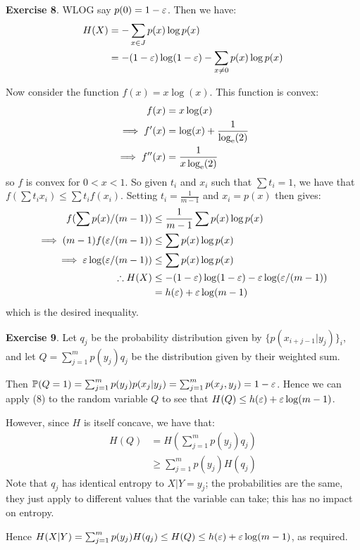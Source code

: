 \documentclass[]{article}
\begin{document}
\textbf{Exercise 8}. WLOG say $p(0) = 1-\varepsilon$. Then we have:
\begin{align*}
    H(X) &= -\sum_{x\in J}p(x)\log p(x)\\
    &= -(1-\varepsilon) \log (1-\varepsilon) -\sum_{x\ne 0}p(x) \log p(x)
\end{align*}

Now consider the function $f(x) = x \log(x)$. This function is convex:
\begin{align*}
    f(x) &= x\log (x)\\
    \implies f'(x) &= \log (x) + \frac{1}{\log_{\mathrm{e}}(2)}\\
    \implies f''(x) &= \frac{1}{x\log_{\mathrm{e}}(2)}
\end{align*}
so $f$ is convex for $0 < x < 1$. So given $t_i$ and $x_i$ such that $\sum t_i = 1$, we have that $f(\sum t_i x_i) \le \sum t_i f(x_i)$. Setting $t_i = \frac{1}{m-1}$ and $x_i = p(x)$ then gives:
\begin{align*}
    f(\sum p(x) / (m-1)) &\le \frac{1}{m-1}\sum p(x)\log p(x)\\
    \implies (m-1)f(\varepsilon /(m-1)) &\le \sum p(x) \log p(x)\\
    \implies \varepsilon \log (\varepsilon/(m-1)) &\le \sum p(x)\log p(x)\\
    \therefore H(X) &\le - (1-\varepsilon)\log (1-\varepsilon) - \varepsilon \log (\varepsilon /(m-1))\\
    &= h(\varepsilon) + \varepsilon\log(m-1)
\end{align*}
which is the desired inequality.

\textbf{Exercise 9}. Let $q_j$ be the probability distribution given by $\{p(x_{i+j-1}|y_j)\}_{i}$, and let $Q = \sum_{j=1}^{m}p(y_j)q_j$ be the distribution given by their weighted sum.

Then $\mathbb{P}(Q = 1) = \sum_{j=1}^{m}p(y_j)p(x_j|y_j) = \sum_{j=1}^{m}p(x_j,y_j) = 1 - \varepsilon$. Hence we can apply (8) to the random variable $Q$ to see that $H(Q) \le h(\varepsilon) + \varepsilon \log (m-1)$.

However, since $H$ is itself concave, we have that:
\begin{align*}
    H(Q) &= H(\sum_{j=1}^{m}p(y_j)q_j)\\
    &\ge \sum_{j=1}^{m}p(y_j)H(q_j)
\end{align*}
Note that $q_j$ has identical entropy to $X|Y = y_j$; the probabilities are the same, they just apply to different values that the variable can take; this has no impact on entropy.

Hence $H(X|Y)  = \sum_{j=1}^{m}p(y_j)H(q_j) \le H(Q) \le h(\varepsilon) + \varepsilon \log (m-1)$, as required.
\end{document}
